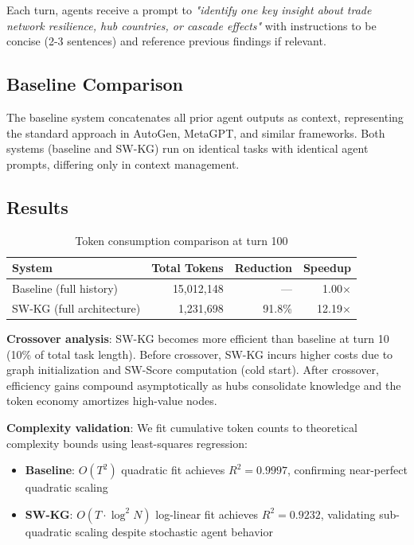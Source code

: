 \documentclass[11pt]{article}
\begin{document}
Each turn, agents receive a prompt to \textit{"identify one key insight about trade network resilience, hub countries, or cascade effects"} with instructions to be concise (2-3 sentences) and reference previous findings if relevant.

\subsection{Baseline Comparison}

The baseline system concatenates all prior agent outputs as context, representing the standard approach in AutoGen, MetaGPT, and similar frameworks. Both systems (baseline and SW-KG) run on identical tasks with identical agent prompts, differing only in context management.

\subsection{Results}

\begin{table}[h]
\centering
\caption{Token consumption comparison at turn 100}
\begin{tabular}{lrrr}
\toprule
\textbf{System} & \textbf{Total Tokens} & \textbf{Reduction} & \textbf{Speedup} \\
\midrule
Baseline (full history) & 15,012,148 & --- & 1.00$\times$ \\
SW-KG (full architecture) & 1,231,698 & 91.8\% & 12.19$\times$ \\
\bottomrule
\end{tabular}
\label{tab:main_results}
\end{table}

\textbf{Crossover analysis}: SW-KG becomes more efficient than baseline at turn 10 (10\% of total task length). Before crossover, SW-KG incurs higher costs due to graph initialization and SW-Score computation (cold start). After crossover, efficiency gains compound asymptotically as hubs consolidate knowledge and the token economy amortizes high-value nodes.

\textbf{Complexity validation}: We fit cumulative token counts to theoretical complexity bounds using least-squares regression:
\begin{itemize}
    \item \textbf{Baseline}: $O(T^2)$ quadratic fit achieves $R^2 = 0.9997$, confirming near-perfect quadratic scaling
    \item \textbf{SW-KG}: $O(T \cdot \log^2 N)$ log-linear fit achieves $R^2 = 0.9232$, validating sub-quadratic scaling despite stochastic agent behavior
\end{itemize}
\end{document}
